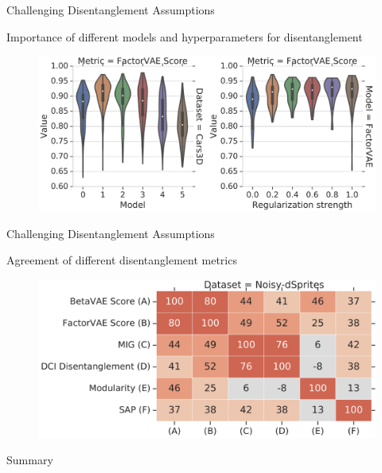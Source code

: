 \begin{frame}{Challenging Disentanglement Assumptions}
	\begin{block}{Importance of different models and hyperparameters for disentanglement}
		\begin{figure}
			\centering
			\includegraphics[width=\linewidth]{figs/challenge_dis_2}
		\end{figure}
	\end{block}

\end{frame}
\begin{frame}{Challenging Disentanglement Assumptions}
	\begin{block}{Agreement of different disentanglement metrics}
		\begin{figure}
			\centering
			\includegraphics[width=0.9\linewidth]{figs/challenge_dis_3}
		\end{figure}
		\vspace{0.5cm}
	\end{block}

\end{frame}
\begin{frame}{Summary}
\end{frame}
 